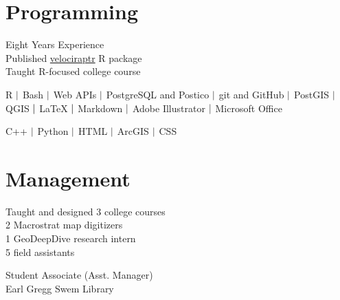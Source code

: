\documentclass[]{deedy-resume-openfont}
\begin{document}
\begin{minipage}[t]{0.33\textwidth}

\section{Programming}
\textbullet{}  Eight Years Experience \\
\textbullet{}  Published \href{https://cran.r-project.org/web/packages/velociraptr/index.html}{velociraptr} R package \\
\textbullet{}  Taught R-focused college course \\
\sectionsep

R $\textcolor{black}{|}$ Bash $\textcolor{black}{|}$ Web APIs $\textcolor{black}{|}$ PostgreSQL and Postico $\textcolor{black}{|}$ git and GitHub $\textcolor{black}{|}$ PostGIS $\textcolor{black}{|}$ QGIS $\textcolor{black}{|}$ LaTeX $\textcolor{black}{|}$ Markdown $\textcolor{black}{|}$ Adobe Illustrator $\textcolor{black}{|}$ Microsoft Office \\
\sectionsep

C++ $\textcolor{black}{|}$ Python $\textcolor{black}{|}$ HTML $\textcolor{black}{|}$ ArcGIS $\textcolor{black}{|}$ CSS
\sectionsep

\section{Management}
\textbullet{} Taught and designed 3 college courses \\
\textbullet{} 2 Macrostrat map digitizers \\
\textbullet{} 1 GeoDeepDive research intern \\
\textbullet{} 5 field assistants \\
\sectionsep

\textbullet{} Student Associate (Asst. Manager) \\ 
Earl Gregg Swem Library
\sectionsep


\end{minipage}
\end{document}
